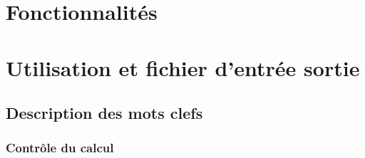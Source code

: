 \documentclass[11pt,a4paper,fleqn]{book}
\begin{document}

\newpage
\thispagestyle{empty}

\setcounter{tocdepth}{1}
\renewcommand{\contentsname}{Sommaire}
\tableofcontents

\newpage
\thispagestyle{empty}


\chapter{Fonctionnalités}


\chapter{Utilisation et fichier d'entrée sortie}

\section{Description des mots clefs}

\subsection{Contrôle du calcul}
\end{document}
